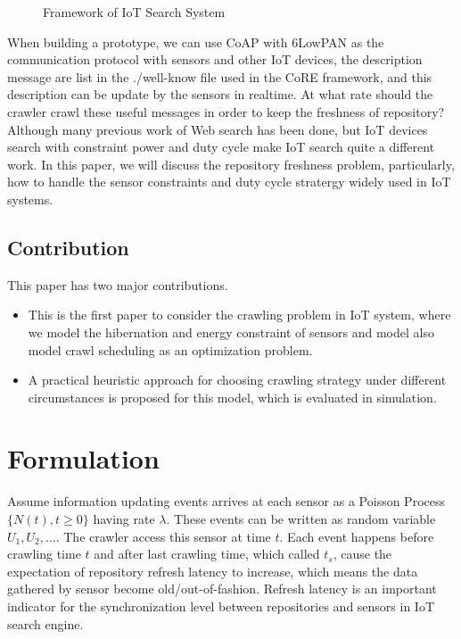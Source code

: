 \documentclass[conference]{IEEEtran}
\begin{document}
\begin{figure}
\centering

\captionsetup{justification=centering}
\caption{Framework of IoT Search System}
\label{fig:framework}
\end{figure}

When building a prototype, we can use CoAP with 6LowPAN as the communication protocol with sensors and other IoT devices, the description message are list in the ./well-know file used in the CoRE framework, and this description can be update by the sensors in realtime.
At what rate should the crawler crawl these useful messages in order to keep the freshness of repository? Although many previous work of Web search has been done, but IoT devices search with constraint power and duty cycle make IoT search quite a different work. In this paper, we will discuss the repository freshness problem, particularly, how to handle the sensor constraints and duty cycle stratergy widely used in IoT systems.

\subsection{Contribution}
This paper has two major contributions. 
\begin{itemize}
\item This is the first paper to consider the crawling problem in IoT system, where we model the hibernation and energy constraint of sensors and model also model crawl scheduling as an optimization problem.
\item A practical heuristic approach for choosing crawling strategy under different circumstances is proposed for this model, which is evaluated in simulation.
\end{itemize}

\section{Formulation}

Assume information updating events arrives at each sensor as a Poisson Process $\{N(t), t\geq0\}$ having rate $\lambda$. 
These events can be written as random variable $U_1, U_2, \ldots$. The crawler access this sensor at time $t$. Each event happens before crawling time $t$ and after last crawling time, which called $t_s$, cause the  expectation of repository refresh latency to increase, which means the data gathered by sensor become old/out-of-fashion. Refresh latency is an important indicator for the synchronization level between repositories and sensors in IoT search engine.
\end{document}
